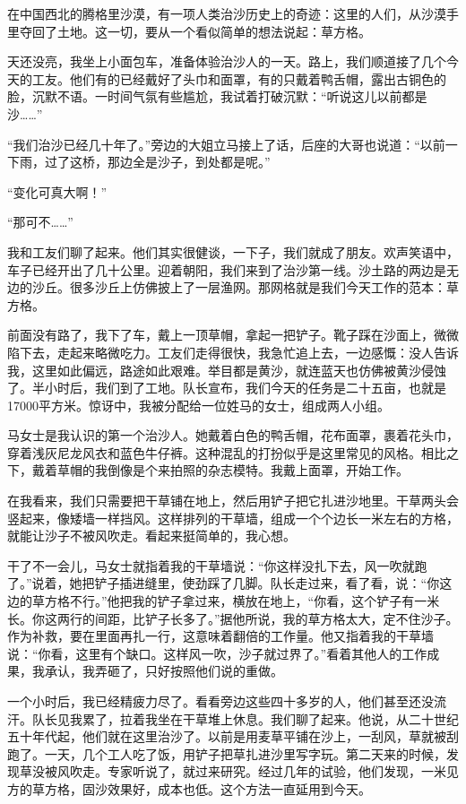 \documentclass[12pt,UTF-8,openany]{ctexbook}
\begin{document}
\begin{large}
    
    在中国西北的腾格里沙漠，有一项人类治沙历史上的奇迹：这里的人们，从沙漠手里夺回了土地。这一切，要从一个看似简单的想法说起：草方格。
    
    天还没亮，我坐上小面包车，准备体验治沙人的一天。路上，我们顺道接了几个今天的工友。他们有的已经戴好了头巾和面罩，有的只戴着鸭舌帽，露出古铜色的脸，沉默不语。一时间气氛有些尴尬，我试着打破沉默：“听说这儿以前都是沙……”
    
    “我们治沙已经几十年了。”旁边的大姐立马接上了话，后座的大哥也说道：“以前一下雨，过了这桥，那边全是沙子，到处都是呢。”
    
    “变化可真大啊！”
    
    “那可不……”
    
    我和工友们聊了起来。他们其实很健谈，一下子，我们就成了朋友。欢声笑语中，车子已经开出了几十公里。迎着朝阳，我们来到了治沙第一线。沙土路的两边是无边的沙丘。很多沙丘上仿佛披上了一层渔网。那网格就是我们今天工作的范本：草方格。
    
    前面没有路了，我下了车，戴上一顶草帽，拿起一把铲子。靴子踩在沙面上，微微陷下去，走起来略微吃力。工友们走得很快，我急忙追上去，一边感慨：没人告诉我，这里如此偏远，路途如此艰难。举目都是黄沙，就连蓝天也仿佛被黄沙侵蚀了。半小时后，我们到了工地。队长宣布，我们今天的任务是二十五亩，也就是17000平方米。惊讶中，我被分配给一位姓马的女士，组成两人小组。
    
    马女士是我认识的第一个治沙人。她戴着白色的鸭舌帽，花布面罩，裹着花头巾，穿着浅灰尼龙风衣和蓝色牛仔裤。这种混乱的打扮似乎是这里常见的风格。相比之下，戴着草帽的我倒像是个来拍照的杂志模特。我戴上面罩，开始工作。
    
    在我看来，我们只需要把干草铺在地上，然后用铲子把它扎进沙地里。干草两头会竖起来，像矮墙一样挡风。这样排列的干草墙，组成一个个边长一米左右的方格，就能让沙子不被风吹走。看起来挺简单的，我心想。
    
    干了不一会儿，马女士就指着我的干草墙说：“你这样没扎下去，风一吹就跑了。”说着，她把铲子插进缝里，使劲踩了几脚。队长走过来，看了看，说：“你这边的草方格不行。”他把我的铲子拿过来，横放在地上，“你看，这个铲子有一米长。你这两行的间距，比铲子长多了。”据他所说，我的草方格太大，定不住沙子。作为补救，要在里面再扎一行，这意味着翻倍的工作量。他又指着我的干草墙说：“你看，这里有个缺口。这样风一吹，沙子就过界了。”看着其他人的工作成果，我承认，我弄砸了，只好按照他们说的重做。
    
    一个小时后，我已经精疲力尽了。看看旁边这些四十多岁的人，他们甚至还没流汗。队长见我累了，拉着我坐在干草堆上休息。我们聊了起来。他说，从二十世纪五十年代起，他们就在这里治沙了。以前是用麦草平铺在沙上，一刮风，草就被刮跑了。一天，几个工人吃了饭，用铲子把草扎进沙里写字玩。第二天来的时候，发现草没被风吹走。专家听说了，就过来研究。经过几年的试验，他们发现，一米见方的草方格，固沙效果好，成本也低。这个方法一直延用到今天。
    

\end{large}
\end{document}

